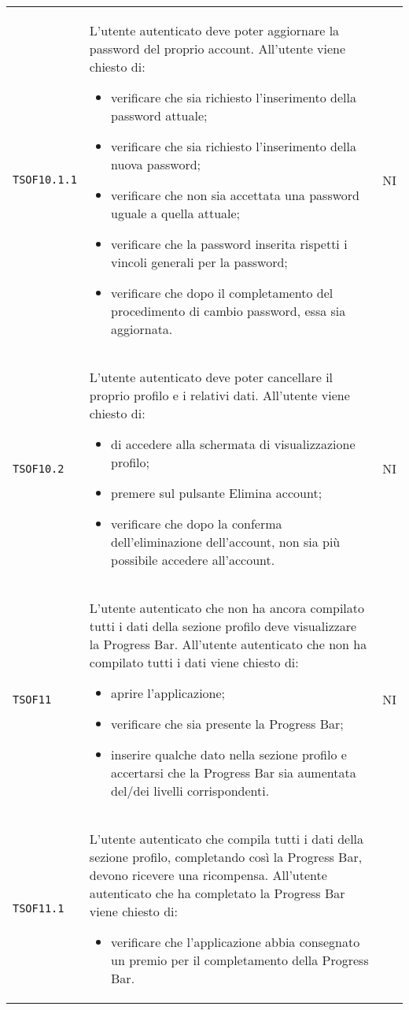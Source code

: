 \begin{longtable}{ >{\centering}p{} >{\centering}p{}
			>{\centering}p{}}
		\texttt{TSOF10.1.1}	&	L'utente autenticato deve poter aggiornare la password del proprio account. All'utente viene chiesto di:
		 \begin{itemize}
		 	\item verificare che sia richiesto l'inserimento della password attuale;
		 	\item verificare che sia richiesto l'inserimento della nuova password;
		 	\item verificare che non sia accettata una password uguale a quella attuale;
		 	\item verificare che la password inserita rispetti i vincoli generali per la password;
		 	\item verificare che dopo il completamento del procedimento di cambio password, essa sia aggiornata.
		 \end{itemize}	&	NI	\tabularnewline
		\texttt{TSOF10.2}	&	L'utente autenticato deve poter cancellare il proprio profilo e i relativi dati. All'utente viene chiesto di:
		 \begin{itemize}
		 	\item di accedere alla schermata di visualizzazione profilo;
		 	\item premere sul pulsante Elimina account;
		 	\item verificare che dopo la conferma dell'eliminazione dell'account, non sia più possibile accedere all'account.
		 \end{itemize}	&	NI	\tabularnewline
		 \texttt{TSOF11}	&	L'utente autenticato che non ha ancora compilato tutti i dati della sezione profilo deve visualizzare la Progress Bar. All'utente autenticato che non ha compilato tutti i dati viene chiesto di:
		 \begin{itemize}
		 	\item aprire l'applicazione;
		 	\item verificare che sia presente la Progress Bar;
		 	\item inserire qualche dato nella sezione profilo e accertarsi che la Progress Bar sia aumentata del/dei livelli corrispondenti.
		 \end{itemize}	&	NI	\tabularnewline
		 \texttt{TSOF11.1}	&	L'utente autenticato che compila tutti i dati della sezione profilo, completando così la Progress Bar, devono ricevere una ricompensa. All'utente autenticato che ha completato la Progress Bar viene chiesto di:
		 \begin{itemize}
		 	\item verificare che l'applicazione abbia consegnato un premio per il completamento della Progress Bar.

\end{itemize}
\end{longtable}
